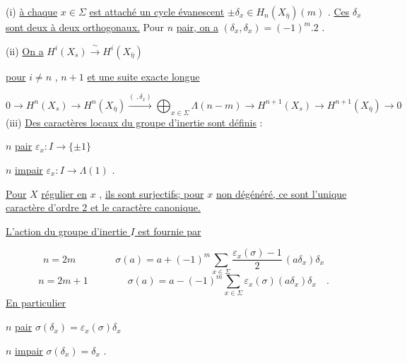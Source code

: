(i) \underline{à chaque} $x \in \Sigma$ \underline{est attaché un cycle évanescent} $\pm \delta_x \in H_n(X_{\bar{\eta}})(m)$ . \underline{Ces} $\delta_x$ \underline{sont deux à deux orthogonaux.} Pour $n$ \underline{pair, on a} $(\delta_x,\delta_x) = (-1)^m.2$ .

(ii) \underline{On a} \qquad $H^i(X_s) \xrightarrow{\ \sim\ } H^i(X_{\bar{\eta}})$

\underline{pour} $i \neq n$ , $n+1$ \underline{et une suite exacte longue} 



\begin{equation*}
 0 \longrightarrow H^n(X_s) \longrightarrow H^n(X_{\overline{\eta}}) \overset{(\ , \delta_x)}{\longrightarrow} \bigoplus_{x \in \Sigma} \Lambda(n-m) \longrightarrow H^{n+1}(X_s) \longrightarrow H^{n+1}(X_{\overline{\eta}}) \longrightarrow 0
\end{equation*}
(iii) \underline{Des caractères locaux du groupe d'inertie sont définis} :

$n$ \quad \underline{pair} \qquad $\varepsilon_x : I \longrightarrow \{\pm 1\}$

$n$ \quad \underline{impair} \qquad $\varepsilon_x : I \longrightarrow \Lambda(1)$ .

\underline{Pour} $X$ \underline{régulier en} $x$ , \underline{ils sont surjectifs; pour} $x$ \underline{non dégénéré, ce sont l'unique caractère d'ordre 2 et le caractère canonique.}

\underline{L'action du groupe d'inertie $I$ est fournie par}

\begin{equation*}
n = 2m \qquad\qquad \sigma(a) = a + (-1)^m \sum_{x \in \Sigma} \frac{\varepsilon_x(\sigma)-1}{2}\, (a\delta_x)\delta_x
\end{equation*}
\begin{equation*}
n = 2m + 1 \qquad\qquad \sigma(a) = a - (-1)^m \sum_{x \in \Sigma} \varepsilon_x(\sigma)(a\delta_x)\delta_x \quad .
\end{equation*}
\underline{En particulier}

$n$ \quad \underline{pair} \qquad $\sigma(\delta_x) = \varepsilon_x(\sigma)\delta_x$

$n$ \quad \underline{impair} \qquad $\sigma(\delta_x) = \delta_x$ .
